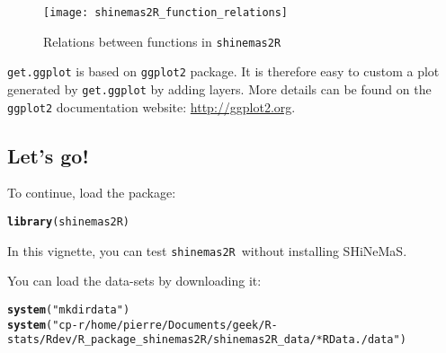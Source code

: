 \documentclass{article}\usepackage[]{graphicx}\usepackage[]{color}
\makeatletter
\newcommand{\hlstr}[1]{\textcolor[rgb]{0.192,0.494,0.8}{#1}}%
\newcommand{\hlstd}[1]{\textcolor[rgb]{0.345,0.345,0.345}{#1}}%
\newcommand{\hlkwd}[1]{\textcolor[rgb]{0.737,0.353,0.396}{\textbf{#1}}}%
\newenvironment{kframe}{%
 \def\at@end@of@kframe{}%
 \ifinner\ifhmode%
  \def\at@end@of@kframe{\end{minipage}}%
  \begin{minipage}{\columnwidth}%
 \fi\fi%
 \def\FrameCommand##1{\hskip\@totalleftmargin \hskip-\fboxsep
 \colorbox{shadecolor}{##1}\hskip-\fboxsep
     \hskip-\linewidth \hskip-\@totalleftmargin \hskip\columnwidth}%
 \MakeFramed {\advance\hsize-\width
   \@totalleftmargin\z@ \linewidth\hsize
   \@setminipage}}%
 {\par\unskip\endMakeFramed%
 \at@end@of@kframe}
\newenvironment{knitrout}{}{} %
\newcommand{\BD}{SHiNeMaS}
\newcommand{\pack}{\texttt{shinemas2R}}
\makeatother
\begin{document}
\begin{figure}[H]
\begin{center}
%
\texttt{[image: shinemas2R\_function\_relations]}
\end{center}
\caption{Relations between functions in \pack}
\label{function_relations}
\end{figure}

\texttt{get.ggplot} is based on \texttt{ggplot2} package.
It is therefore easy to custom a plot generated by \texttt{get.ggplot} by adding layers.
More details can be found on the \texttt{ggplot2} documentation website: \url{http://ggplot2.org}.

\subsection{Let’s go!}

To continue, load the package:
\begin{knitrout}
\color{fgcolor}\begin{kframe}
\begin{alltt}
\hlkwd{library}\hlstd{(shinemas2R)}
\end{alltt}
\end{kframe}
\end{knitrout}

In this vignette, you can test \pack~without installing \BD.

You can load the data-sets by downloading it:

\begin{knitrout}
\color{fgcolor}\begin{kframe}
\begin{alltt}
\hlkwd{system}\hlstd{(}\hlstr{"mkdir data"}\hlstd{)}
\hlkwd{system}\hlstd{(}\hlstr{"cp -r /home/pierre/Documents/geek/R-stats/Rdev/R_package_shinemas2R/shinemas2R_data/*RData ./data"}\hlstd{)}
\end{alltt}
\end{kframe}
\end{knitrout}
\end{document}
